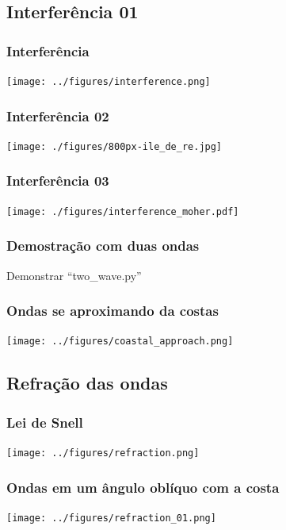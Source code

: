 \subsection{Interferência 01}
\begin{frame}
\frametitle{Interferência}
\begin{center}
  \texttt{[image: ../figures/interference.png]}
\end{center}
\end{frame}


\begin{frame}
\frametitle{Interferência 02}
\begin{center}
  \texttt{[image: ./figures/800px-ile\_de\_re.jpg]}
\end{center}
\end{frame}


\begin{frame}
\frametitle{Interferência 03}
\begin{center}
  \texttt{[image: ./figures/interference\_moher.pdf]}
\end{center}
\end{frame}


\begin{frame}
  \frametitle{Demostração com duas ondas}
  \begin{block}{}
    Demonstrar ``two\_wave.py''
  \end{block}
\end{frame}

\begin{frame}
\frametitle{Ondas se aproximando da costas}
\begin{center}
  \texttt{[image: ../figures/coastal\_approach.png]}
\end{center}
\end{frame}


\subsection{Refração das ondas}
\begin{frame}
\frametitle{Lei de Snell}
  \begin{center}
    \texttt{[image: ../figures/refraction.png]}
  \end{center}
\end{frame}


\begin{frame}
\frametitle{Ondas em um ângulo oblíquo com a costa}
  \begin{center}
    \texttt{[image: ../figures/refraction\_01.png]}
  \end{center}
\end{frame}


